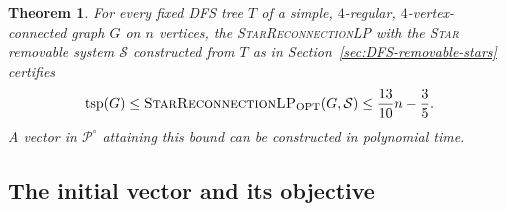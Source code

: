 \documentclass[11pt]{amsart}
\newcommand{\1}{\mathbbm{1}}
\newcommand{\LPtwo}{\textsc{StarReconnectionLP}}
\newtheorem{theorem}{Theorem}[section]
\begin{document}
\begin{theorem}
\label{thm:quartic-thirteen-tenths}
For every fixed DFS tree $T$ of a simple, $4$-regular,
$4$-vertex-connected graph $G$ on $n$ vertices, the \LPtwo{} with
the \textsc{Star} removable system $\mathcal S$ constructed
from $T$ as in Section~\ref{sec:DFS-removable-stars} certifies
\[
 \operatorname{tsp}(G)\le \text{\LPtwo}_{\mathrm{OPT}}(G,\mathcal S)
 \le \frac{13}{10}n-\frac35.
\]
A vector in ${\mathcal P^\circ}$ attaining this bound can be constructed in
polynomial time.

\end{theorem}



\subsection{The initial vector and its objective}
\end{document}
